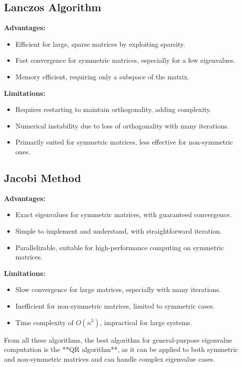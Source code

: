 \documentclass[journal]{IEEEtran}
\begin{document}
\subsection*{Lanczos Algorithm}
\textbf{Advantages:}
\begin{itemize}
    \item Efficient for large, sparse matrices by exploiting sparsity.
    \item Fast convergence for symmetric matrices, especially for a few eigenvalues.
    \item Memory efficient, requiring only a subspace of the matrix.
\end{itemize}
\textbf{Limitations:}
\begin{itemize}
    \item Requires restarting to maintain orthogonality, adding complexity.
    \item Numerical instability due to loss of orthogonality with many iterations.
    \item Primarily suited for symmetric matrices, less effective for non-symmetric ones.
\end{itemize}

\subsection*{Jacobi Method}
\textbf{Advantages:}
\begin{itemize}
    \item Exact eigenvalues for symmetric matrices, with guaranteed convergence.
    \item Simple to implement and understand, with straightforward iteration.
    \item Parallelizable, suitable for high-performance computing on symmetric matrices.
\end{itemize}
\textbf{Limitations:}
\begin{itemize}
    \item Slow convergence for large matrices, especially with many iterations.
    \item Inefficient for non-symmetric matrices, limited to symmetric cases.
    \item Time complexity of $O(n^3)$, impractical for large systems.
\end{itemize}

From all these algorithms, the best algorithm for general-purpose eigenvalue computation is the **QR algorithm**, as it can be applied to both symmetric and non-symmetric matrices and can handle complex eigenvalue cases.
\end{document}
